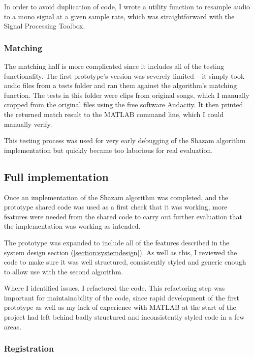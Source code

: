 \documentclass[12pt,a4paper,twoside,openright]{report}
\begin{document}
In order to avoid duplication of code, I wrote a utility function to resample audio to a mono signal at a given sample rate, which was straightforward with the Signal Processing Toolbox.

\subsubsection{Matching}

The matching half is more complicated since it includes all of the testing functionality. The first prototype's version was severely limited -- it simply took audio files from a tests folder and ran them against the algorithm's matching function. The tests in this folder were clips from original songs, which I manually cropped from the original files using the free software Audacity. It then printed the returned match result to the MATLAB command line, which I could manually verify.

This testing process was used for very early debugging of the Shazam algorithm implementation but quickly became too laborious for real evaluation.


\subsection{Full implementation}

Once an implementation of the Shazam algorithm was completed, and the prototype shared code was used as a first check that it was working, more features were needed from the shared code to carry out further evaluation that the implementation was working as intended.

The prototype was expanded to include all of the features described in the system design section (\ref{section:systemdesign}). As well as this, I reviewed the code to make sure it was well structured, consistently styled and generic enough to allow use with the second algorithm. 

Where I identified issues, I refactored the code. This refactoring step was important for maintainability of the code, since rapid development of the first prototype as well as my lack of experience with MATLAB at the start of the project had left behind badly structured and inconsistently styled code in a few areas.


\subsubsection{Registration}
\end{document}
